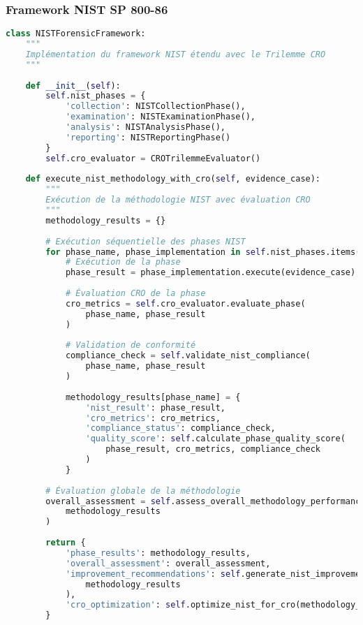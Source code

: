 \subsubsection{Framework NIST SP 800-86}

\begin{lstlisting}[language=Python, caption=Implémentation du framework NIST avec extension CRO]
class NISTForensicFramework:
    """
    Implémentation du framework NIST étendu avec le Trilemme CRO
    """
    
    def __init__(self):
        self.nist_phases = {
            'collection': NISTCollectionPhase(),
            'examination': NISTExaminationPhase(),
            'analysis': NISTAnalysisPhase(),
            'reporting': NISTReportingPhase()
        }
        self.cro_evaluator = CROTrilemmeEvaluator()
        
    def execute_nist_methodology_with_cro(self, evidence_case):
        """
        Exécution de la méthodologie NIST avec évaluation CRO
        """
        methodology_results = {}
        
        # Exécution séquentielle des phases NIST
        for phase_name, phase_implementation in self.nist_phases.items():
            # Exécution de la phase
            phase_result = phase_implementation.execute(evidence_case)
            
            # Évaluation CRO de la phase
            cro_metrics = self.cro_evaluator.evaluate_phase(
                phase_name, phase_result
            )
            
            # Validation de conformité
            compliance_check = self.validate_nist_compliance(
                phase_name, phase_result
            )
            
            methodology_results[phase_name] = {
                'nist_result': phase_result,
                'cro_metrics': cro_metrics,
                'compliance_status': compliance_check,
                'quality_score': self.calculate_phase_quality_score(
                    phase_result, cro_metrics, compliance_check
                )
            }
            
        # Évaluation globale de la méthodologie
        overall_assessment = self.assess_overall_methodology_performance(
            methodology_results
        )
        
        return {
            'phase_results': methodology_results,
            'overall_assessment': overall_assessment,
            'improvement_recommendations': self.generate_nist_improvements(
                methodology_results
            ),
            'cro_optimization': self.optimize_nist_for_cro(methodology_results)
        }
    

\end{lstlisting}
